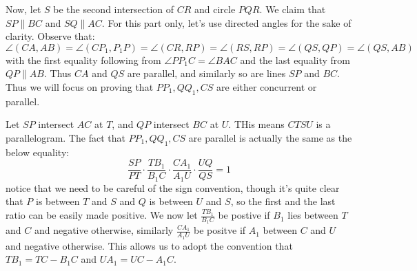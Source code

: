 \documentclass[11pt,a4paper]{article}
\begin{document}
\begin{enumerate}
	
	Now, let $S$ be the second intersection of $CR$ and circle $PQR$. We claim that $SP\parallel BC$ and $SQ\parallel AC$. For this part only, let's use directed angles for the sake of clarity. Observe that: 
	\[\angle(CA, AB)=\angle (CP_1, P_1P) = \angle (CR, RP) = \angle(RS, RP)=\angle (QS, QP) = \angle (QS, AB)
	\]
	with the first equality following from $\angle PP_1C =\angle BAC$ and the last equality from $QP\parallel AB$. Thus $CA$ and $QS$ are parallel, and similarly so are lines $SP$ and $BC$. Thus we will focus on proving that $PP_1, QQ_1, CS$ are either concurrent or parallel. 
	
	Let $SP$ intersect $AC$ at $T$, and $QP$ intersect $BC$ at $U$. THis means $CTSU$ is a parallelogram. The fact that $PP_1, QQ_1, CS$ are parallel is actually the same as the below equality:
	\[
	\frac{SP}{PT}\cdot \frac{TB_1}{B_1C}\cdot \frac{CA_1}{A_1U}\cdot \frac{UQ}{QS}=1
	\]
	notice that we need to be careful of the sign convention, though it's quite clear that $P$ is between $T$ and $S$ and $Q$ is between $U$ and $S$, so the first and the last ratio can be easily made positive. 
	We now let $\frac{TB_1}{B_1C}$ be postive if $B_1$ lies between $T$ and $C$ and negative otherwise, similarly $\frac {CA_1}{A_1U}$ be positve if $A_1$ between $C$ and $U$ and negative otherwise. This allows us to adopt the convention that $TB_1=TC-B_1C$ and $UA_1=UC-A_1C$. 
	

\end{enumerate}
\end{document}
